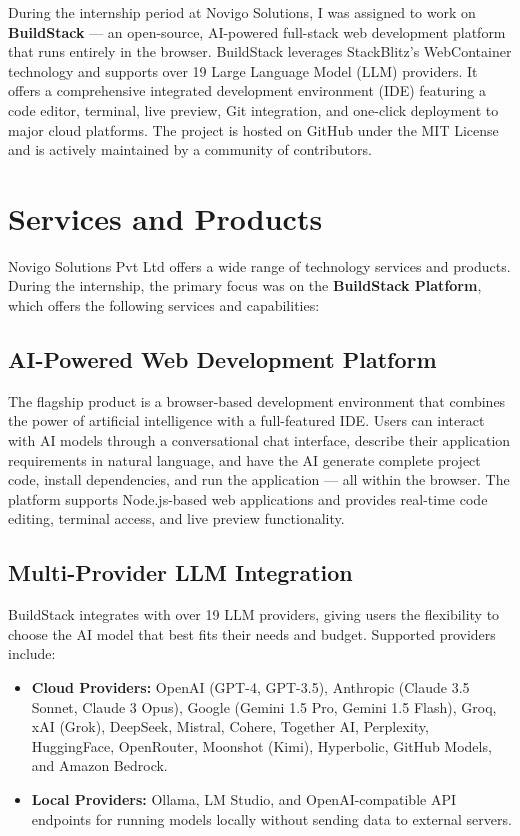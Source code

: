 \documentclass[12pt,a4paper,openany]{report}
\begin{document}
During the internship period at Novigo Solutions, I was assigned to work on \textbf{BuildStack} --- an open-source, AI-powered full-stack web development platform that runs entirely in the browser. BuildStack leverages StackBlitz's WebContainer technology and supports over 19 Large Language Model (LLM) providers. It offers a comprehensive integrated development environment (IDE) featuring a code editor, terminal, live preview, Git integration, and one-click deployment to major cloud platforms. The project is hosted on GitHub under the MIT License and is actively maintained by a community of contributors.

\section{Services and Products}

Novigo Solutions Pvt Ltd offers a wide range of technology services and products. During the internship, the primary focus was on the \textbf{BuildStack Platform}, which offers the following services and capabilities:

\subsection{AI-Powered Web Development Platform}
The flagship product is a browser-based development environment that combines the power of artificial intelligence with a full-featured IDE. Users can interact with AI models through a conversational chat interface, describe their application requirements in natural language, and have the AI generate complete project code, install dependencies, and run the application --- all within the browser. The platform supports Node.js-based web applications and provides real-time code editing, terminal access, and live preview functionality.

\subsection{Multi-Provider LLM Integration}
BuildStack integrates with over 19 LLM providers, giving users the flexibility to choose the AI model that best fits their needs and budget. Supported providers include:
\begin{itemize}
    \item \textbf{Cloud Providers:} OpenAI (GPT-4, GPT-3.5), Anthropic (Claude 3.5 Sonnet, Claude 3 Opus), Google (Gemini 1.5 Pro, Gemini 1.5 Flash), Groq, xAI (Grok), DeepSeek, Mistral, Cohere, Together AI, Perplexity, HuggingFace, OpenRouter, Moonshot (Kimi), Hyperbolic, GitHub Models, and Amazon Bedrock.
    \item \textbf{Local Providers:} Ollama, LM Studio, and OpenAI-compatible API endpoints for running models locally without sending data to external servers.
\end{itemize}
\end{document}

